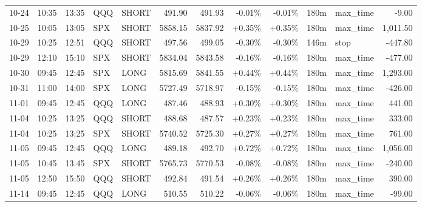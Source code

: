 \documentclass[11pt,a4paper]{article}
\begin{document}
\begin{center}
\begin{longtable}{>{\color{txtmain}}l l l l l r r r r r >{\color{txtmain}}l r}
10-24 & 10:35 & 13:35 & QQQ & SHORT & 491.90 & 491.93 & \textcolor{lossred}{-0.01\%} & \textcolor{lossred}{-0.01\%} & 180m & max\_time & \textcolor{lossred}{-9.00} \\
10-25 & 10:05 & 13:05 & SPX & SHORT & 5858.15 & 5837.92 & \textcolor{wingreen}{+0.35\%} & \textcolor{wingreen}{+0.35\%} & 180m & max\_time & \textcolor{wingreen}{1,011.50} \\
10-29 & 10:25 & 12:51 & QQQ & SHORT & 497.56 & 499.05 & \textcolor{lossred}{-0.30\%} & \textcolor{lossred}{-0.30\%} & 146m & stop & \textcolor{lossred}{-447.80} \\
10-29 & 12:10 & 15:10 & SPX & SHORT & 5834.04 & 5843.58 & \textcolor{lossred}{-0.16\%} & \textcolor{lossred}{-0.16\%} & 180m & max\_time & \textcolor{lossred}{-477.00} \\
10-30 & 09:45 & 12:45 & SPX & LONG & 5815.69 & 5841.55 & \textcolor{wingreen}{+0.44\%} & \textcolor{wingreen}{+0.44\%} & 180m & max\_time & \textcolor{wingreen}{1,293.00} \\
10-31 & 11:00 & 14:00 & SPX & LONG & 5727.49 & 5718.97 & \textcolor{lossred}{-0.15\%} & \textcolor{lossred}{-0.15\%} & 180m & max\_time & \textcolor{lossred}{-426.00} \\
11-01 & 09:45 & 12:45 & QQQ & LONG & 487.46 & 488.93 & \textcolor{wingreen}{+0.30\%} & \textcolor{wingreen}{+0.30\%} & 180m & max\_time & \textcolor{wingreen}{441.00} \\
11-04 & 10:25 & 13:25 & QQQ & SHORT & 488.68 & 487.57 & \textcolor{wingreen}{+0.23\%} & \textcolor{wingreen}{+0.23\%} & 180m & max\_time & \textcolor{wingreen}{333.00} \\
11-04 & 10:25 & 13:25 & SPX & SHORT & 5740.52 & 5725.30 & \textcolor{wingreen}{+0.27\%} & \textcolor{wingreen}{+0.27\%} & 180m & max\_time & \textcolor{wingreen}{761.00} \\
11-05 & 09:45 & 12:45 & QQQ & LONG & 489.18 & 492.70 & \textcolor{wingreen}{+0.72\%} & \textcolor{wingreen}{+0.72\%} & 180m & max\_time & \textcolor{wingreen}{1,056.00} \\
11-05 & 10:45 & 13:45 & SPX & SHORT & 5765.73 & 5770.53 & \textcolor{lossred}{-0.08\%} & \textcolor{lossred}{-0.08\%} & 180m & max\_time & \textcolor{lossred}{-240.00} \\
11-05 & 12:50 & 15:50 & QQQ & SHORT & 492.84 & 491.54 & \textcolor{wingreen}{+0.26\%} & \textcolor{wingreen}{+0.26\%} & 180m & max\_time & \textcolor{wingreen}{390.00} \\
11-14 & 09:45 & 12:45 & QQQ & LONG & 510.55 & 510.22 & \textcolor{lossred}{-0.06\%} & \textcolor{lossred}{-0.06\%} & 180m & max\_time & \textcolor{lossred}{-99.00} \\

\end{longtable}
\end{center}
\end{document}
